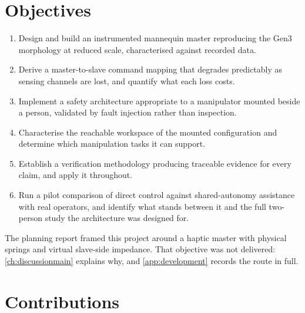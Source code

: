 \section{Objectives}

\begin{enumerate}
  \item Design and build an instrumented mannequin master reproducing the
    Gen3 morphology at reduced scale, characterised against recorded data.
  \item Derive a master-to-slave command mapping that degrades predictably as
    sensing channels are lost, and quantify what each loss costs.
  \item Implement a safety architecture appropriate to a manipulator mounted
    beside a person, validated by fault injection rather than inspection.
  \item Characterise the reachable workspace of the mounted configuration and
    determine which manipulation tasks it can support.
  \item Establish a verification methodology producing traceable evidence for
    every claim, and apply it throughout.
  \item Run a pilot comparison of direct control against shared-autonomy
    assistance with real operators, and identify what stands between it and
    the full two-person study the architecture was designed for.
\end{enumerate}

The planning report framed this project around a haptic master with physical
springs and virtual slave-side impedance. That objective was not delivered:
\cref{ch:discussionmain} explains why, and \cref{app:development} records the
route in full.

\section{Contributions}

